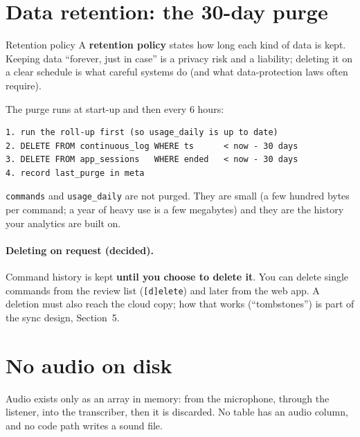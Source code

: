 \documentclass[11pt,a4paper]{article}
\begin{document}
\section{Data retention: the 30-day purge}

\begin{concept}{Retention policy}
A \textbf{retention policy} states how long each kind of data is kept. Keeping data
``forever, just in case'' is a privacy risk and a liability; deleting it on a clear schedule is
what careful systems do (and what data-protection laws often require).
\end{concept}

\noindent The purge runs at start-up and then every 6 hours:
\begin{lstlisting}
1. run the roll-up first (so usage_daily is up to date)
2. DELETE FROM continuous_log WHERE ts      < now - 30 days
3. DELETE FROM app_sessions   WHERE ended   < now - 30 days
4. record last_purge in meta
\end{lstlisting}
\noindent \texttt{commands} and \texttt{usage\_daily} are not purged. They are small (a few
hundred bytes per command; a year of heavy use is a few megabytes) and they are the history
your analytics are built on.

\paragraph{Deleting on request (decided).} Command history is kept \textbf{until you choose to
delete it}. You can delete single commands from the review list (\texttt{[d]elete}) and later
from the web app. A deletion must also reach the cloud copy; how that works (``tombstones'') is
part of the sync design, Section~5.

\section{No audio on disk}
Audio exists only as an array in memory: from the microphone, through the listener, into the
transcriber, then it is discarded. No table has an audio column, and no code path writes a
sound file.
\end{document}
